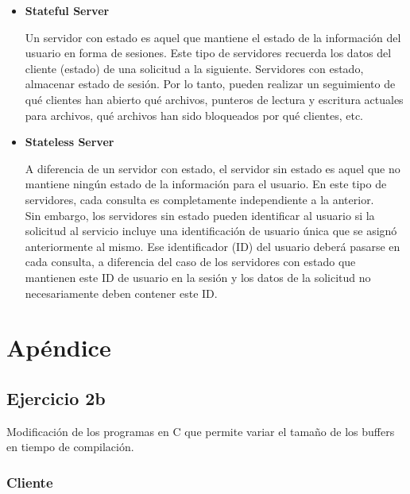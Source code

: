 \documentclass[osajnl,twocolumn,showpacs,superscriptaddress,10pt]{revtex4-1} %
\begin{document}
\begin{itemize}
    \item \textbf{Stateful Server}
    
    Un servidor con estado es aquel que mantiene el estado de la información del usuario en forma de sesiones. Este tipo de servidores recuerda los datos del cliente (estado) de una solicitud a la siguiente. Servidores con estado, almacenar estado de sesión. Por lo tanto, pueden realizar un seguimiento de qué clientes han abierto qué archivos, punteros de lectura y escritura actuales para archivos, qué archivos han sido bloqueados por qué clientes, etc.
    
    \item \textbf{Stateless Server}
    
    A diferencia de un servidor con estado, el servidor sin estado es aquel que no mantiene ningún estado de la información para el usuario. En este tipo de servidores, cada consulta es completamente independiente a la anterior. \\
    Sin embargo, los servidores sin estado pueden identificar al usuario si la solicitud al servicio incluye una identificación de usuario única que se asignó anteriormente al mismo. Ese identificador (ID) del usuario deberá pasarse en cada consulta, a diferencia del caso de los servidores con estado que mantienen este ID de usuario en la sesión y los datos de la solicitud no necesariamente deben contener este ID.
\end{itemize}

\clearpage

\onecolumngrid

\section{Apéndice}

\subsection{Ejercicio 2b} \label{apendix:2b}

Modificación de los programas en C que permite variar el tamaño de los buffers en tiempo de compilación.

\subsubsection{Cliente} \label{apendix:2b_client}

\inputminted[mathescape]{c}{../resources/csock/client_2b.c}
\end{document}
